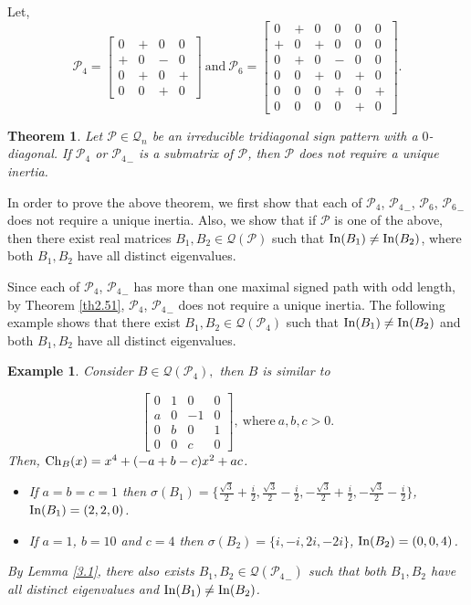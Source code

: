 \documentclass[a4paper, 10pt]{article}
\newtheorem{theorem}{Theorem}[section]
\newtheorem{eg}{Example}[section]
\numberwithin{equation}{section}
\def\In{{\rm In}}
\def\Ch{{\rm Ch}}
\begin{document}
Let, $$\mathcal{P}_4=\begin{bmatrix}
	0&+&0&0\\+&0&-&0\\0&+&0&+\\0&0&+&0
\end{bmatrix}~\text{and}~\mathcal{P}_6=\begin{bmatrix}
	0&+&0&0&0&0\\+&0&+&0&0&0\\0&+&0&-&0&0\\0&0&+&0&+&0\\0&0&0&+&0&+\\0&0&0&0&+&0
\end{bmatrix}.$$
\begin{theorem}\label{nth3.4}
	Let $\mathcal{P}\in \mathcal{Q}_n$ be an irreducible tridiagonal sign pattern with a $0$-diagonal. If $\mathcal{P}_4$ or ${\mathcal{P}_4}_-$ is a submatrix of $\mathcal{P}$, then $\mathcal{P}$ does not require a unique inertia.
\end{theorem}

In order to prove the above theorem, we first show that each of $\mathcal{P}_4$, ${\mathcal{P}_4}_-$, $\mathcal{P}_6$, ${\mathcal{P}_6}_-$ does not require a unique inertia. Also, we show that if $\mathcal{P}$ is one of the above, then there exist real matrices $B_1, B_2\in \mathcal{Q}(\mathcal{P})$ such that $\In(B_1)\neq \In(B_2)$, where both $B_1, B_2$ have all distinct eigenvalues. 

Since each of $\mathcal{P}_4$, ${\mathcal{P}_4}_-$ has more than one maximal signed path with odd length, by Theorem \ref{th2.51}, $\mathcal{P}_4$, ${\mathcal{P}_4}_-$ does not require a unique inertia. The following example shows that there exist $B_1, B_2\in \mathcal{Q}(\mathcal{P}_4)$ such that $\In(B_1)\neq \In(B_2)$ and both $B_1, B_2$ have all distinct eigenvalues.
\begin{eg} \label{eg3.1}
	Consider $B\in \mathcal{Q}(\mathcal{P}_4),$ then $B$ is similar to
	
	$$\begin{bmatrix}
		0&1&0&0\\ a&0&-1&0\\ 0&b&0&1\\ 0&0&c&0
	\end{bmatrix},~\text{where}~ a,b,c>0.$$ Then, $\Ch_B(x)=x^4+(-a+b-c)x^2+ac$. 
	\begin{itemize}
		\item[i.] If $a=b=c=1$ then $\sigma(B_1)=\{\frac{\sqrt{3}}{2}+\frac{i}{2},\frac{\sqrt{3}}{2}- \frac{i}{2},-\frac{\sqrt{3}}{2}+ \frac{i}{2},- \frac{\sqrt{3}}{2}-\frac{i}{2}\}$, $\In(B_1)=(2,2,0)$.
		\item[ii.] If $a=1$, $b=10$ and $c=4$ then $\sigma(B_2)=\{i,-i, 2i,-2i\}$, $\In(B_2)=(0,0,4)$.
	\end{itemize}
	By Lemma \ref{3.1}, there also exists $B_1,B_2\in \mathcal{Q}({\mathcal{P}_{4}}_-)$ such that both $B_1, B_2$ have all distinct eigenvalues and $\In(B_1)\neq \In(B_2)$.
\end{eg}
\end{document}
